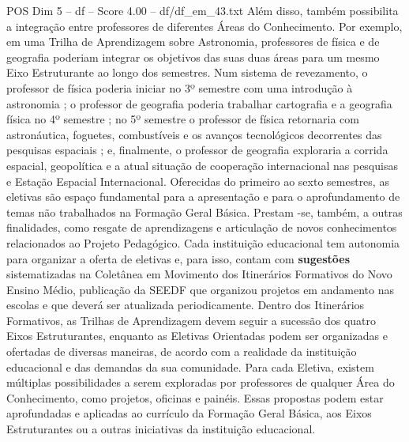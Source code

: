 \begin{textsample}{POS Dim 5 – df – Score 4.00 – df/df\_em\_43.txt}
Além disso, também possibilita a integração entre professores de diferentes Áreas do Conhecimento.
Por exemplo, em uma Trilha de Aprendizagem sobre Astronomia, professores de física e de geografia poderiam integrar os objetivos das suas duas áreas para um mesmo Eixo Estruturante ao longo dos semestres.
Num sistema de revezamento, o professor de física poderia iniciar no 3º semestre com uma introdução à astronomia ; o professor de geografia poderia trabalhar cartografia e a geografia física no 4º semestre ; no 5º semestre o professor de física retornaria com astronáutica, foguetes, combustíveis e os avanços tecnológicos decorrentes das pesquisas espaciais ; e, finalmente, o professor de geografia exploraria a corrida espacial, geopolítica e a atual situação de cooperação internacional nas pesquisas e Estação Espacial Internacional.
Oferecidas do primeiro ao sexto semestres, as eletivas são espaço fundamental para a apresentação e para o aprofundamento de temas não trabalhados na Formação Geral Básica.
Prestam -se, também, a outras finalidades, como resgate de aprendizagens e articulação de novos conhecimentos relacionados ao Projeto Pedagógico.
Cada instituição educacional tem autonomia para organizar a oferta de eletivas e, para isso, contam com \textbf{sugestões} sistematizadas na Coletânea em Movimento dos Itinerários Formativos do Novo Ensino Médio, publicação da SEEDF que organizou projetos em andamento nas escolas e que deverá ser atualizada periodicamente.
Dentro dos Itinerários Formativos, as Trilhas de Aprendizagem devem seguir a sucessão dos quatro Eixos Estruturantes, enquanto as Eletivas Orientadas podem ser organizadas e ofertadas de diversas maneiras, de acordo com a realidade da instituição educacional e das demandas da sua comunidade.
Para cada Eletiva, existem múltiplas possibilidades a serem exploradas por professores de qualquer Área do Conhecimento, como projetos, oficinas e painéis.
Essas propostas podem estar aprofundadas e aplicadas ao currículo da Formação Geral Básica, aos Eixos Estruturantes ou a outras iniciativas da instituição educacional.

\end{textsample}
